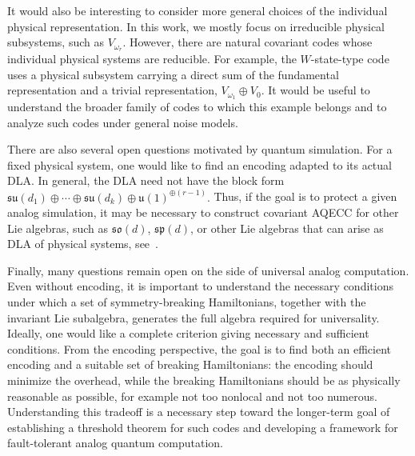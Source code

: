 \documentclass[10pt,twocolumn,superscriptaddress,aps,amsmath,amssymb,citeautoscript,floatfix,prx]{revtex4-2}
\newcounter{alg}
\theoremstyle{plain}
\theoremstyle{plain}
\theoremstyle{plain}
\theoremstyle{plain}
\theoremstyle{plain}
\theoremstyle{plain}
\begin{document}
It would also be interesting to consider more general choices of the individual physical representation. In this work, we mostly focus on irreducible physical subsystems, such as \(V_{\omega_r}\). However, there are natural covariant codes whose individual physical systems are reducible. For example, the \(W\)-state-type code~\cite{Faist2020, Alexander2025} uses a physical subsystem carrying a direct sum of the fundamental representation and a trivial representation,
$
    V_{\omega_1}\oplus V_0.
$
It would be useful to understand the broader family of codes to which this example belongs and to analyze such codes under general noise models.

There are also several open questions motivated by quantum simulation. For a fixed physical system, one would like to find an encoding adapted to its actual DLA. In general, the DLA need not have the block form
$
    \mathfrak{su}(d_1)\oplus\cdots\oplus\mathfrak{su}(d_k)
    \oplus
    \mathfrak{u}(1)^{\oplus(r-1)}.
$
Thus, if the goal is to protect a given analog simulation, it may be necessary to construct covariant AQECC for other Lie algebras, such as \(\mathfrak{so}(d)\), \(\mathfrak{sp}(d)\), or other Lie algebras that can arise as DLA of physical systems, see~\cite{Kokcu2024, Wiersema2024}.

Finally, many questions remain open on the side of universal analog computation. Even without encoding, it is important to understand the necessary conditions under which a set of symmetry-breaking Hamiltonians, together with the invariant Lie subalgebra, generates the full algebra required for universality. Ideally, one would like a complete criterion giving necessary and sufficient conditions. From the encoding perspective, the goal is to find both an efficient encoding and a suitable set of breaking Hamiltonians: the encoding should minimize the overhead, while the breaking Hamiltonians should be as physically reasonable as possible, for example not too nonlocal and not too numerous. Understanding this tradeoff is a necessary step toward the longer-term goal of establishing a threshold theorem for such codes and developing a framework for fault-tolerant analog quantum computation.

 
\end{document}
